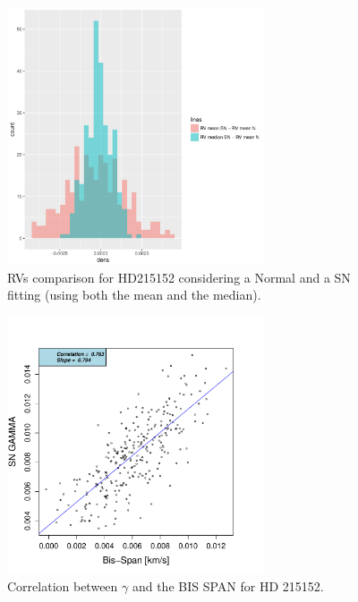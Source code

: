 \documentclass[11pt, oneside]{article}
\begin{document}
%
\begin{figure}[htbp]
   \centering
\includegraphics[height = 3in]{[0]HD21515_HistogramsDiff.pdf} 
   \caption{RVs comparison for HD215152 considering a Normal and a SN fitting (using both the mean and the median).}
   \label{fig:HD215152:RV}
\end{figure}
%
\begin{figure}[htbp]
   \centering
\includegraphics[height = 3in]{HD21515_[2]gamma_vs_bisspan.pdf} 
   \caption{Correlation between $\gamma$ and the BIS SPAN for HD 215152.}
   \label{fig:HD215152:corr.gamma}
\end{figure}
%
\end{document}
